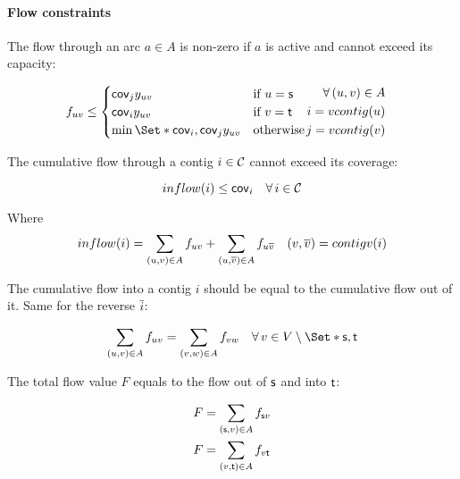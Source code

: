 \paragraph{Flow constraints}

The flow through an arc \(a \in A\) is non-zero if \(a\) is active and cannot exceed its capacity:
\begin{Constraint}
  \begin{align}
    f_{uv} \leq
    \begin{cases}
      \cov{j} y_{uv} & \text{if \(u = \source{}\)} \\
      \cov{i} y_{uv} & \text{if \(v = \sink{}\)} \\
      \min\Set*{\cov{i}, \cov{j}} y_{uv} & \text{otherwise}
    \end{cases} &
    \begin{split}
      \forall (u, v) \in A \\
      i = vcontig(u) \\
      j = vcontig(v)
    \end{split} \label{pbf_iterbin:milp:cst:flow:arc_flow_at_most_coverage} %
  \end{align}
\end{Constraint}

The cumulative flow through a contig \(i \in \mathcal{C}{}\) cannot exceed its coverage:
\begin{Constraint}
  \begin{equation}
    inflow(i) \leq \cov{i} \quad \forall i \in \Contigs{} \label{pbf_iterbin:milp:cst:flow:inflow_at_most_coverage} %
  \end{equation}
\end{Constraint}
Where \[
  inflow(i) = \sum_{(u, v) \in A} f_{uv} + \sum_{(u, \overline{v}) \in A} f_{u\overline{v}} \quad (v, \overline{v}) = contigv(i)
\]

The cumulative flow into a contig \(i\) should be equal to the cumulative flow out of it. Same for the reverse \(\overline{i}\):
\begin{Constraint}
  \begin{equation}
    \sum_{(u, v) \in A} f_{u v} = \sum_{(v, w) \in A} f_{v w} \quad \forall v \in V \setminus \Set*{\source{}, \sink{}} \label{pbf_iterbin:milp:cst:flow:flow_conservation} %
  \end{equation}
\end{Constraint}

The total flow value \(F\) equals to the flow out of \(\mathsf{s}{}\) and into \(\mathsf{t}{}\):
\begin{Constraint}
  \begin{align}
    F & = \sum_{(\source{}, v) \in A} f_{\source{} v} \label{pbf_iterbin:milp:cst:flow:total_flow_source} \\ %
    F & = \sum_{(v, \sink{}) \in A} f_{v \sink{}} \label{pbf_iterbin:milp:cst:flow:total_flow_sink} %
  \end{align}
\end{Constraint}

